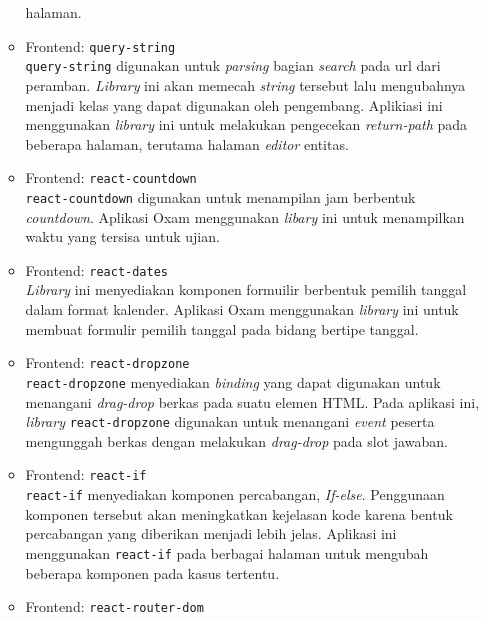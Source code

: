 \begin{itemize}
\begin{itemize}
                    halaman.
                \item Frontend: \texttt{query-string} \\
                    \texttt{query-string} digunakan untuk \textit{parsing} bagian \textit{search} pada url dari
                    peramban. \textit{Library} ini akan memecah \textit{string} tersebut lalu mengubahnya menjadi
                    kelas yang dapat digunakan oleh pengembang. Aplikiasi ini menggunakan \textit{library} ini untuk
                    melakukan pengecekan \textit{return-path} pada beberapa halaman, terutama halaman \textit{editor}
                    entitas.
                \item Frontend: \texttt{react-countdown} \\
                    \texttt{react-countdown} digunakan untuk menampilan jam berbentuk \textit{countdown}. 
                    Aplikasi Oxam menggunakan \textit{libary} ini untuk menampilkan waktu yang tersisa
                    untuk ujian.
                \item Frontend: \texttt{react-dates} \\
                    \textit{Library} ini menyediakan komponen formuilir berbentuk pemilih tanggal dalam 
                    format kalender. Aplikasi Oxam menggunakan \textit{library} ini untuk membuat formulir
                    pemilih tanggal pada bidang bertipe tanggal.
                \item Frontend: \texttt{react-dropzone} \\
                    \texttt{react-dropzone} menyediakan \textit{binding} yang dapat digunakan untuk menangani
                    \textit{drag-drop} berkas pada suatu elemen HTML. Pada aplikasi ini, \textit{library}
                    \texttt{react-dropzone} digunakan untuk menangani \textit{event} peserta mengunggah berkas
                    dengan melakukan \textit{drag-drop} pada slot jawaban.
                \item Frontend: \texttt{react-if} \\
                    \texttt{react-if} menyediakan komponen percabangan, \textit{If-else}. Penggunaan komponen
                    tersebut akan meningkatkan kejelasan kode karena bentuk percabangan yang diberikan menjadi
                    lebih jelas. Aplikasi ini menggunakan \texttt{react-if} pada berbagai halaman untuk mengubah
                    beberapa komponen pada kasus tertentu.
                \item Frontend: \texttt{react-router-dom} \\

\end{itemize}
\end{itemize}
